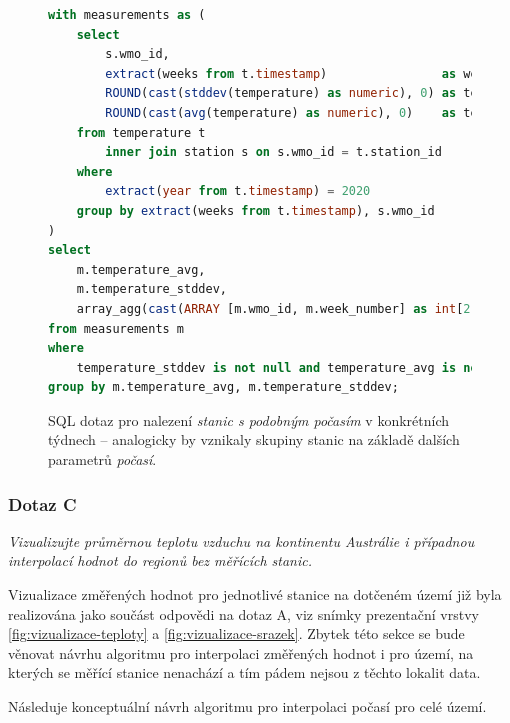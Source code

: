 \documentclass[10pt,a4paper,titlepage]{extarticle}
\begin{document}
\begin{figure}[H]
    \begin{lstlisting}[language=SQL]
with measurements as (
    select
        s.wmo_id,
        extract(weeks from t.timestamp)                as week_number,
        ROUND(cast(stddev(temperature) as numeric), 0) as temperature_stddev,
        ROUND(cast(avg(temperature) as numeric), 0)    as temperature_avg
    from temperature t
        inner join station s on s.wmo_id = t.station_id
    where
        extract(year from t.timestamp) = 2020
    group by extract(weeks from t.timestamp), s.wmo_id
)
select
    m.temperature_avg,
    m.temperature_stddev,
    array_agg(cast(ARRAY [m.wmo_id, m.week_number] as int[2])) as stations_in_time
from measurements m
where
    temperature_stddev is not null and temperature_avg is not null
group by m.temperature_avg, m.temperature_stddev;
    \end{lstlisting}
    \caption{SQL dotaz pro nalezení \emph{stanic s podobným počasím} v konkrétních týdnech -- analogicky by vznikaly
    skupiny stanic na základě dalších parametrů \emph{počasí}.}
    \label{lst:sql-dotaz-b}
\end{figure}

    \subsubsection{Dotaz C}

    \emph{Vizualizujte průměrnou teplotu vzduchu na kontinentu Austrálie i případnou interpolací hodnot do regionů
    bez měřících stanic.}

    Vizualizace změřených hodnot pro jednotlivé stanice na dotčeném území již byla realizována jako součást odpovědi
    na dotaz A, viz snímky prezentační vrstvy \ref{fig:vizualizace-teploty} a \ref{fig:vizualizace-srazek}. Zbytek
    této sekce se bude věnovat návrhu algoritmu pro interpolaci změřených hodnot i pro území, na kterých se měřící
    stanice nenachází a tím pádem nejsou z těchto lokalit data.

    Následuje konceptuální návrh algoritmu pro interpolaci počasí pro celé území.
    
\end{document}

